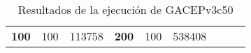 \begin{table}[H]
\begin{tabular}{|ccrccrccc}
\multicolumn{1}{|c|}{\multirow{-39}{*}{\cellcolor[HTML]{FFFFC7}\textbf{100}}} & \multicolumn{1}{c|}{\multirow{-9}{*}{\cellcolor[HTML]{DDFDFF}100}} & \multicolumn{1}{r|}{\cellcolor[HTML]{DAE8FC}113758}    & \multicolumn{1}{c|}{\multirow{-39}{*}{\cellcolor[HTML]{FFFFC7}\textbf{200}}} & \multicolumn{1}{c|}{\multirow{-10}{*}{\cellcolor[HTML]{DDFDFF}100}} & \multicolumn{1}{r|}{\cellcolor[HTML]{DDFDFF}538408}    &                                                                              &                                                                    &                                                        \\ \cline{1-6}
\end{tabular}
\caption{\label{GACEPv3c50GRASP}Resultados de la ejecución de GACEPv3c50}
\end{table}

